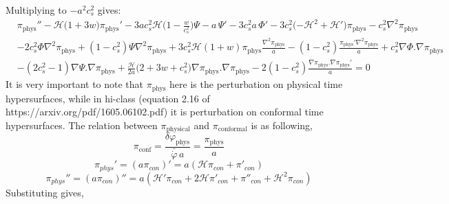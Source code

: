 \documentclass[a4paper,11pt]{article}
\def\be{\begin{equation}}
\def\ee{\end{equation}}
\begin{document}
  Multiplying to $-a^2 c_s^2$ gives:
 \begin{align} 
 &\pi_{\text{phys}}'' - \mathcal{H} \Big (1+ 3w \Big)\pi_{\text{phys}}' -3 {a c_s^2 \mathcal{H}}\Big( 1- \frac{w}{c_s^2} \Big )\Psi -a \, {\Psi'}- 3 c_s^2 a \,{\Phi'} 
  -3  c_s^2 \Big({-\mathcal{H}^2 + \mathcal{H}'} \Big) \pi_{\text{phys}} 
 - c_s^2 {\nabla^2 \pi_{\text{phys}} }
             \nonumber
   \\
    &
     -2 c_s^2  \Phi  {\nabla^2 \pi_{\text{phys}} }  
  +   (1-c_s^2)  \Psi {\nabla^2 \pi_{\text{phys}} }
  +3 c_s^2 \mathcal{H} (1+w)\pi_{\text{phys}} \frac{\nabla^2 \pi_{\text{phys}} }{a}  
        -   (1-c_s^2) \frac{ \pi_{\text{phys}}' \nabla^2 {\pi_{\text{phys}} }}{a}   
             +c_s^2 {\nabla  \Phi . \nabla \pi_{\text{phys}} }
               \nonumber 
               \\
                &
        -(2 c_s^2-1) {\nabla  \Psi . \nabla \pi_{\text{phys}} }  
 +\frac{\mathcal{H}} {2 a} \Big(2+3w+c_s^2  \Big){\nabla  \pi_{\text{phys}} . \nabla \pi_{\text{phys}} } 
    -2   (1-c_s^2)\frac{\nabla  \pi_{\text{phys}} . \nabla {\pi_{\text{phys}}'} } {a}       =0
  \end{align} 
It is very important to note that $\pi_{\text{phys}}$ here is the perturbation on physical time hypersurfaces, while in hi-class (equation 2.16 of https://arxiv.org/pdf/1605.06102.pdf) it is perturbation on conformal time hypersurfaces. The relation between $\pi_{\text{physical}}$ and $\pi_{\text{conformal}}$ is as following,
\be
\pi_{\text{conf}}= \frac{\delta \varphi_{\text{phys}}}{\bar{\dot{\varphi}} \, a} = \frac{\pi_{\text{phys}}}{a}
\ee
{\color{blue}
\be
\pi_{phys}'=(a \pi_{con})'=a (\mathcal{H} \pi_{con}+ \pi'_{con})
\ee
}
{\color{blue}
\be
\pi_{phys}''=(a \pi_{con})''=a( \mathcal{H}' \pi_{con}+2 \mathcal{H} \pi'_{con} +\pi''_{con}+ \mathcal{H}^2 \pi_{con} )
\ee
}
Substituting gives,
\end{document}
